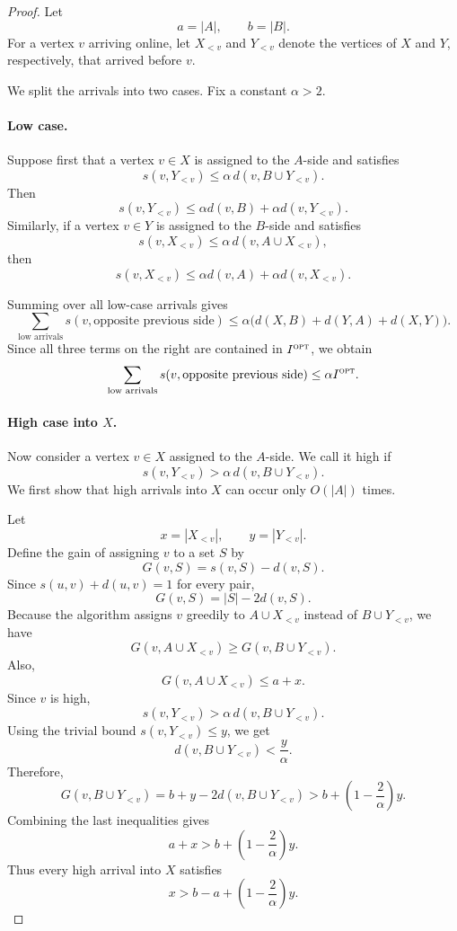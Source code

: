 \begin{proof}
Let
\[
    a=|A|,
    \qquad
    b=|B|.
\]
For a vertex $v$ arriving online, let $X_{<v}$ and $Y_{<v}$ denote the vertices
of $X$ and $Y$, respectively, that arrived before $v$.

We split the arrivals into two cases. Fix a constant $\alpha>2$.

\paragraph{Low case.}
Suppose first that a vertex $v\in X$ is assigned to the $A$-side and satisfies
\[
    s(v,Y_{<v})
    \le
    \alpha\, d(v,B\cup Y_{<v}).
\]
Then
\[
    s(v,Y_{<v})
    \le
    \alpha d(v,B)+\alpha d(v,Y_{<v}).
\]
Similarly, if a vertex $v\in Y$ is assigned to the $B$-side and satisfies
\[
    s(v,X_{<v})
    \le
    \alpha\, d(v,A\cup X_{<v}),
\]
then
\[
    s(v,X_{<v})
    \le
    \alpha d(v,A)+\alpha d(v,X_{<v}).
\]

Summing over all low-case arrivals gives
\[
    \sum_{\text{low arrivals}} s(v,\text{opposite previous side})
    \le
    \alpha\bigl(d(X,B)+d(Y,A)+d(X,Y)\bigr).
\]
Since all three terms on the right are contained in $I^{\textsc{opt}}$, we obtain
\[
    \sum_{\text{low arrivals}} s(v,\text{opposite previous side})
    \le
    \alpha I^{\textsc{opt}}.
\]

\paragraph{High case into $X$.}
Now consider a vertex $v\in X$ assigned to the $A$-side. We call it high if
\[
    s(v,Y_{<v})
    >
    \alpha\, d(v,B\cup Y_{<v}).
\]
We first show that high arrivals into $X$ can occur only $O(|A|)$ times.

Let
\[
    x=|X_{<v}|,
    \qquad
    y=|Y_{<v}|.
\]
Define the gain of assigning $v$ to a set $S$ by
\[
    G(v,S)=s(v,S)-d(v,S).
\]
Since $s(u,v)+d(u,v)=1$ for every pair,
\[
    G(v,S)=|S|-2d(v,S).
\]
Because the algorithm assigns $v$ greedily to $A\cup X_{<v}$ instead of
$B\cup Y_{<v}$, we have
\[
    G(v,A\cup X_{<v})
    \ge
    G(v,B\cup Y_{<v}).
\]
Also,
\[
    G(v,A\cup X_{<v})\le a+x.
\]
Since $v$ is high,
\[
    s(v,Y_{<v})>\alpha\,d(v,B\cup Y_{<v}).
\]
Using the trivial bound $s(v,Y_{<v})\le y$, we get
\[
    d(v,B\cup Y_{<v})<\frac{y}{\alpha}.
\]
Therefore,
\[
    G(v,B\cup Y_{<v})
    =
    b+y-2d(v,B\cup Y_{<v})
    >
    b+\left(1-\frac{2}{\alpha}\right)y.
\]
Combining the last inequalities gives
\[
    a+x
    >
    b+\left(1-\frac{2}{\alpha}\right)y.
\]
Thus every high arrival into $X$ satisfies
\[
    x
    >
    b-a+\left(1-\frac{2}{\alpha}\right)y.
\]


\end{proof}
